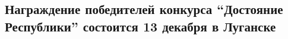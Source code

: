  
 
 
 
 
\subsection{Награждение победителей конкурса \enquote{Достояние Республики} состоится 13 декабря в Луганске}
\label{sec:10_12_2021.stz.news.lnr.lug_info.1.nagrazhdenie_konkurs_dostojanie_respubliki}

